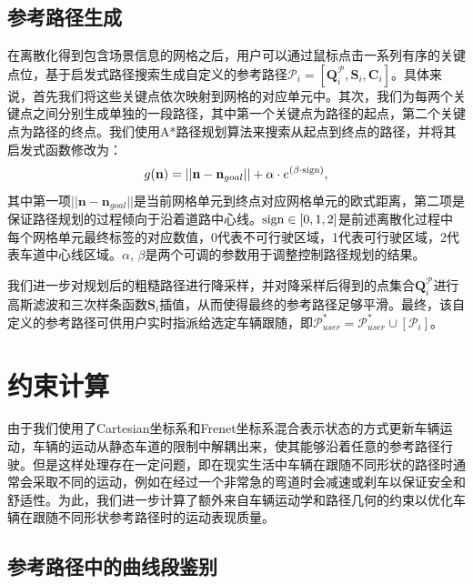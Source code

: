 \subsection{参考路径生成}
\label{section:traedits_planning}

在离散化得到包含场景信息的网格之后，用户可以通过鼠标点击一系列有序的关键点位，基于启发式路径搜索生成自定义的参考路径$\mathscr{P}_i = [\textbf{Q}^{\mathscr{P}}_{i}, \textbf{S}_{i}, \textbf{C}_{i}]$。具体来说，首先我们将这些关键点依次映射到网格的对应单元中。其次，我们为每两个关键点之间分别生成单独的一段路径，其中第一个关键点为路径的起点，第二个关键点为路径的终点。我们使用A*路径规划算法来搜索从起点到终点的路径，并将其启发式函数修改为：
\begin{equation}
\setlength\abovedisplayskip{6pt}
\setlength\belowdisplayskip{6pt}
    g(\textbf{n}) = || \textbf{n} - \textbf{n}_{goal} || + \alpha \cdot e^{\left( \beta \cdot \rm{sign} \right)},
\label{eq:traedits_planingheuristic}
\end{equation}
其中第一项$|| \textbf{n} - \textbf{n}_{goal} ||$是当前网格单元到终点对应网格单元的欧式距离，第二项是保证路径规划的过程倾向于沿着道路中心线。$\rm{sign} \in [0,1,2]$是前述离散化过程中每个网格单元最终标签的对应数值，0代表不可行驶区域，1代表可行驶区域，2代表车道中心线区域。$\alpha$, $\beta$是两个可调的参数用于调整控制路径规划的结果。 

我们进一步对规划后的粗糙路径进行降采样，并对降采样后得到的点集合$\textbf{Q}^{\mathscr{P}}_{i}$进行高斯滤波和三次样条函数$\textbf{S}_{i}$插值，从而使得最终的参考路径足够平滑。最终，该自定义的参考路径可供用户实时指派给选定车辆跟随，即$\mathscr{P}^*_{user}=\mathscr{P}^*_{user} \cup [\mathscr{P}_{i}]$。




\section{约束计算}

由于我们使用了Cartesian坐标系和Frenet坐标系混合表示状态的方式更新车辆运动，车辆的运动从静态车道的限制中解耦出来，使其能够沿着任意的参考路径行驶。但是这样处理存在一定问题，即在现实生活中车辆在跟随不同形状的路径时通常会采取不同的运动，例如在经过一个非常急的弯道时会减速或刹车以保证安全和舒适性。为此，我们进一步计算了额外来自车辆运动学和路径几何的约束以优化车辆在跟随不同形状参考路径时的运动表现质量。

\subsection{参考路径中的曲线段鉴别}

